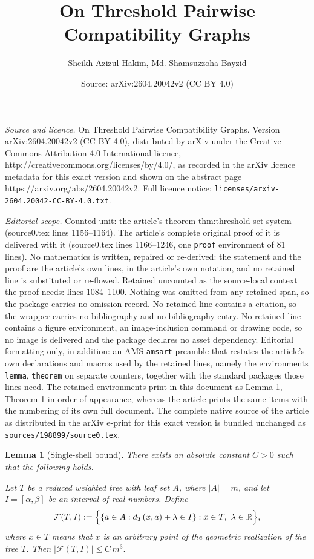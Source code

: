 \documentclass[10pt,a4paper]{amsart}
\title{On Threshold Pairwise Compatibility Graphs}
\author{Sheikh Azizul Hakim, Md. Shamsuzzoha Bayzid}
\date{Source: arXiv:2604.20042v2 (CC BY 4.0)}
\newtheorem{lemma}{Lemma}
\begin{document}
\maketitle

\noindent\emph{Source and licence.} On Threshold Pairwise Compatibility Graphs. Version arXiv:2604.20042v2 (CC BY 4.0), distributed by arXiv under the Creative Commons Attribution 4.0 International licence, http://creativecommons.org/licenses/by/4.0/, as recorded in the arXiv licence metadata for this exact version and shown on the abstract page https://arxiv.org/abs/2604.20042v2. Full licence notice: \texttt{licenses/arxiv-2604.20042-CC-BY-4.0.txt}.\par\smallskip

\noindent\textit{Editorial scope.} Counted unit: the article's theorem thm:threshold-set-system (source0.tex lines 1156--1164). The article's complete original proof of it is delivered with it (source0.tex lines 1166--1246, one \texttt{proof} environment of 81 lines). No mathematics is written, repaired or re-derived: the statement and the proof are the article's own lines, in the article's own notation, and no retained line is substituted or re-flowed.  Retained uncounted as the source-local context the proof needs: lines 1084--1100.  Nothing was omitted from any retained span, so the package carries no omission record.  No retained line contains a citation, so the wrapper carries no bibliography and no bibliography entry.  No retained line contains a figure environment, an image-inclusion command or drawing code, so no image is delivered and the package declares no asset dependency.  Editorial formatting only, in addition: an AMS \texttt{amsart} preamble that restates the article's own declarations and macros used by the retained lines, namely the environments \texttt{lemma}, \texttt{theorem} on separate counters, together with the standard packages those lines need.  The retained environments print in this document as Lemma 1, Theorem 1 in order of appearance, whereas the article prints the same items with the numbering of its own full document.  The complete native source of the article as distributed in the arXiv e-print for this exact version is bundled unchanged as \texttt{sources/198899/source0.tex}.
\begin{lemma}[Single-shell bound]\label{lem:single-shell-bound}
There exists an absolute constant \(C>0\) such that the following holds.

Let \(T\) be a reduced weighted tree with leaf set \(A\), where \(|A|=m\), and let
\(I=[\alpha,\beta]\) be an interval of real numbers. Define
\[
\mathcal F(T,I):=
\Bigl\{
\{a\in A:d_T(x,a)+\lambda\in I\}: x\in T,\ \lambda\in\mathbb R
\Bigr\},
\]
where \(x\in T\) means that \(x\) is an arbitrary point of the geometric realization of
the tree \(T\). Then
\(
|\mathcal F(T,I)|\le C\,m^3.
\)
\end{lemma}
\end{document}
